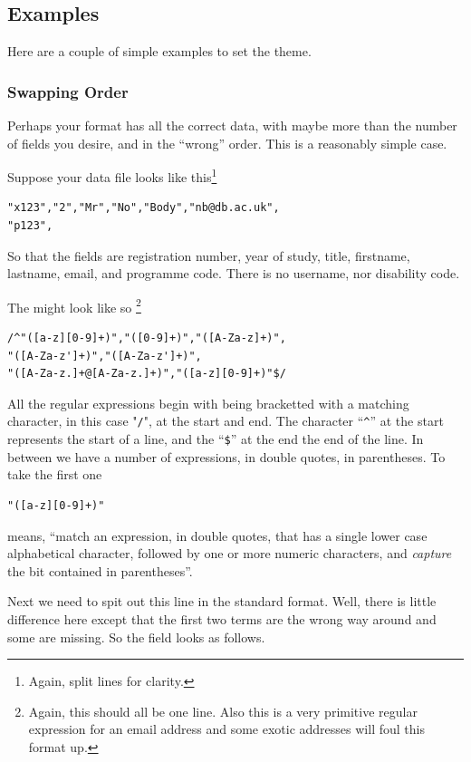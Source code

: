 \documentclass[12 pt]{book}
\begin{document}
\subsection{Examples}

Here are a couple of simple examples to set the theme.

\subsubsection{Swapping Order}

Perhaps your format has all the correct data, with maybe more than the
number of fields you desire, and in the ``wrong'' order. This is a reasonably
simple case.

Suppose your data file looks like this\footnote{Again, split lines for clarity.}
\begin{lstlisting}
"x123","2","Mr","No","Body","nb@db.ac.uk",
"p123",
\end{lstlisting}

So that the fields are registration number, year of study, title, firstname,
lastname, email, and programme code. There is no username, nor disability code.

The  might look like so%
\footnote{Again, this should all be one line. Also this is a very primitive
regular expression for an email address and some exotic addresses will foul
this format up.}
\begin{lstlisting}
/^"([a-z][0-9]+)","([0-9]+)","([A-Za-z]+)",
"([A-Za-z']+)","([A-Za-z']+)",
"([A-Za-z.]+@[A-Za-z.]+)","([a-z][0-9]+)"$/
\end{lstlisting}

All the regular expressions begin with being bracketted with a matching
character, in this case
"\lstinline!/!", at the start and end. The character ``\lstinline!^!'' at the
start represents the
start of a line, and the ``\lstinline!$!'' at the end the end of the line. In
between we have a number of expressions, in double quotes, in parentheses. To
take the first one
\begin{lstlisting}
"([a-z][0-9]+)"
\end{lstlisting}
means, ``match an expression, in double quotes, that has a single lower case
alphabetical character, followed by one or more numeric characters, and
\emph{capture} the bit contained in parentheses''.

Next we need to spit out this line in the standard format. Well, there is
little difference here except that the first two terms are the wrong way
around and some are missing. So the  field looks as
follows.
\end{document}
